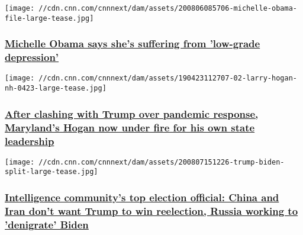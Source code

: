 \href{/2020/08/06/us/michelle-obama-coronavirus-depression-trnd/index.html}{}

\texttt{[image: //cdn.cnn.com/cnnnext/dam/assets/200806085706-michelle-obama-file-large-tease.jpg]}

\hypertarget{michelle-obama-says-shes-suffering-from-low-grade-depression}{%
\subsubsection{\texorpdfstring{\href{/2020/08/06/us/michelle-obama-coronavirus-depression-trnd/index.html}{Michelle
Obama says she's suffering from 'low-grade
depression'}}{Michelle Obama says she's suffering from 'low-grade depression'}}\label{michelle-obama-says-shes-suffering-from-low-grade-depression}}

\href{/2020/08/08/politics/larry-hogan-coronavirus-schools-voting-elections/index.html}{}

\texttt{[image: //cdn.cnn.com/cnnnext/dam/assets/190423112707-02-larry-hogan-nh-0423-large-tease.jpg]}

\hypertarget{after-clashing-with-trump-over-pandemic-response-marylands-hogan-now-under-fire-for-his-own-state-leadership-}{%
\subsubsection{\texorpdfstring{\href{/2020/08/08/politics/larry-hogan-coronavirus-schools-voting-elections/index.html}{After
clashing with Trump over pandemic response, Maryland's Hogan now under
fire for his own state leadership
}}{After clashing with Trump over pandemic response, Maryland's Hogan now under fire for his own state leadership }}\label{after-clashing-with-trump-over-pandemic-response-marylands-hogan-now-under-fire-for-his-own-state-leadership-}}

\href{/2020/08/07/politics/2020-election-russia-china-iran/index.html}{}

\texttt{[image: //cdn.cnn.com/cnnnext/dam/assets/200807151226-trump-biden-split-large-tease.jpg]}

\hypertarget{intelligence-communitys-top-election-official-china-and-iran-dont-want-trump-to-win-reelection-russia-working-to-denigrate-biden}{%
\subsubsection{\texorpdfstring{\href{/2020/08/07/politics/2020-election-russia-china-iran/index.html}{Intelligence
community's top election official: China and Iran don't want Trump to
win reelection, Russia working to 'denigrate'
Biden}}{Intelligence community's top election official: China and Iran don't want Trump to win reelection, Russia working to 'denigrate' Biden}}\label{intelligence-communitys-top-election-official-china-and-iran-dont-want-trump-to-win-reelection-russia-working-to-denigrate-biden}}


